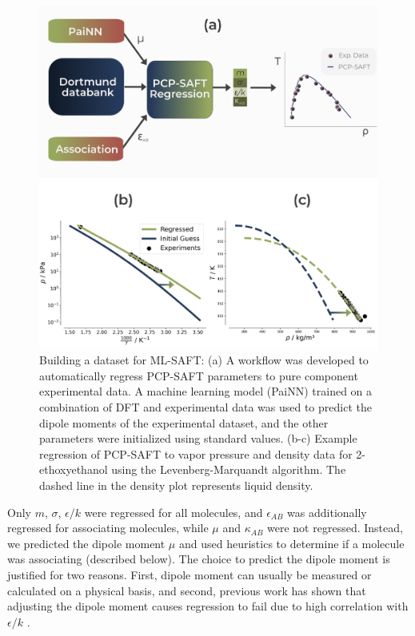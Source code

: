 \begin{figure}
    \centering
    \includegraphics[width=\textwidth]{gfx/Chapter08/deepsaft_regression.png}
    \caption{Building a dataset for ML-SAFT: (a) A workflow was developed to automatically regress PCP-SAFT parameters to pure component experimental data. A machine learning model (PaiNN) trained on a combination of DFT and experimental data was used to predict the dipole moments of the experimental dataset, and the other parameters were initialized using standard values. (b-c) Example regression of PCP-SAFT to vapor pressure and density data for 2-ethoxyethanol using the Levenberg-Marquandt algorithm. The dashed line in the density plot represents liquid density.}
    \label{fig:ML-SAFT_regression}
\end{figure}

Only $m$, $\sigma$, $\epsilon/k$ were regressed for all molecules, and $\epsilon_{AB}$ was additionally regressed for associating molecules, while $\mu$ and $\kappa_{AB}$ were not regressed. Instead, we predicted the dipole moment $\mu$ and used heuristics to determine if a molecule was associating (described below). The choice to predict the dipole moment is justified for two reasons. First, dipole moment can usually be measured or calculated on a physical basis, and second, previous work has shown that adjusting the dipole moment causes regression to fail due to high correlation with $\epsilon/k$ \cite{Cripwell2017, deVilliers2011}. 

